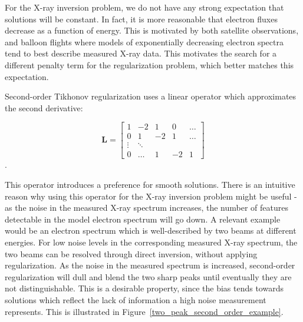 For the X-ray inversion problem, we do not have any strong expectation that solutions will be constant. In fact, it is more reasonable that electron fluxes decrease as a function of energy. This is motivated by both satellite observations, and balloon flights where models of exponentially decreasing electron spectra tend to best describe measured X-ray data. This motivates the search for a different penalty term for the regularization problem, which better matches this expectation. 

Second-order Tikhonov regularization uses a linear operator which approximates the second derivative:

\[
\mathbf{L} = \begin{bmatrix} 
    1 & -2 & 1 & 0 & \dots \\
    0 & 1 & -2 & 1 & \dots \\
    \vdots & \ddots & \\
    0 & \dots & 1 & -2 & 1 
    \end{bmatrix}
\].

This operator introduces a preference for smooth solutions. There is an intuitive reason why using this operator for the X-ray inversion problem might be useful - as the noise in the measured X-ray spectrum increases, the number of features detectable in the model electron spectrum will go down. A relevant example would be an electron spectrum which is well-described by two beams at different energies. For low noise levels in the corresponding measured X-ray spectrum, the two beams can be resolved through direct inversion, without applying regularization. As the noise in the measured spectrum is increased, second-order regularization will dull and blend the two sharp peaks until eventually they are not distinguishable.  This is a desirable property, since the bias tends towards solutions which reflect the lack of information a high noise measurement represents. This is illustrated in Figure~\ref{two_peak_second_order_example}.


